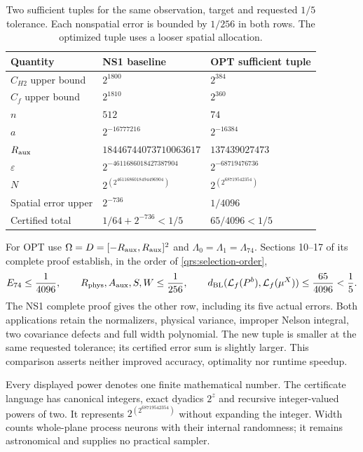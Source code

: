 \documentclass[11pt]{article}
\theoremstyle{plain}
\theoremstyle{definition}
\theoremstyle{remark}
\begin{document}
\begin{table}[!htbp]
\centering\small
\caption{Two sufficient tuples for the same observation, target and requested
$1/5$ tolerance. Each nonspatial error is bounded by $1/256$ in both rows.
The optimized tuple uses a looser spatial allocation.}
\label{qrs:tuple-table}
\begin{tabular}{@{}p{}p{}p{}@{}}
\toprule
Quantity & NS1 baseline & OPT sufficient tuple\\
\midrule
$C_{H2}$ upper bound & $2^{1800}$ & $2^{384}$\\
$C_f$ upper bound & $2^{1810}$ & $2^{360}$\\
$n$ & $512$ & $74$\\
$a$ & $2^{-16777216}$ & $2^{-16384}$\\
$R_{\rm aux}$ & $18446744073710063617$ & $137439027473$\\
$\varepsilon$ & $2^{-4611686018427387904}$ & $2^{-68719476736}$\\
$N$ & $2^{(2^{4611686018494496904})}$ & $2^{(2^{68719542354})}$\\
Spatial error upper & $2^{-736}$ & $1/4096$\\
Certified total & $1/64+2^{-736}<1/5$ & $65/4096<1/5$\\
\bottomrule
\end{tabular}
\end{table}

For OPT use $\Omega=D=[-R_{\rm aux},R_{\rm aux}]^2$ and
$\Lambda_0=\Lambda_1=\Lambda_{74}$. Sections 10--17 of its complete proof
establish, in the order of \eqref{qrs:selection-order},
\begin{equation}\label{qrs:OPT-errors}
 E_{74}\le\frac1{4096},\qquad
 R_{\rm phys},A_{\rm aux},S,W\le\frac1{256},\qquad
 d_{\rm BL}(\mathcal L_f(P^b),\mathcal L_f(\mu^X))
    \le\frac{65}{4096}<\frac15.
\end{equation}
The NS1 complete proof gives the other row, including its five actual
errors. Both applications retain the normalizers, physical variance,
improper Nelson integral, two covariance defects and full width polynomial.
The new tuple is smaller at the same requested tolerance; its certified
error sum is slightly larger. This comparison asserts neither improved
accuracy, optimality nor runtime speedup.

Every displayed power denotes one finite mathematical number. The
certificate language has canonical integers, exact dyadics $2^z$ and
recursive integer-valued powers of two. It represents
$2^{(2^{68719542354})}$ without expanding the integer. Width counts
whole-plane process neurons with their internal randomness; it remains
astronomical and supplies no practical sampler.
\end{document}
